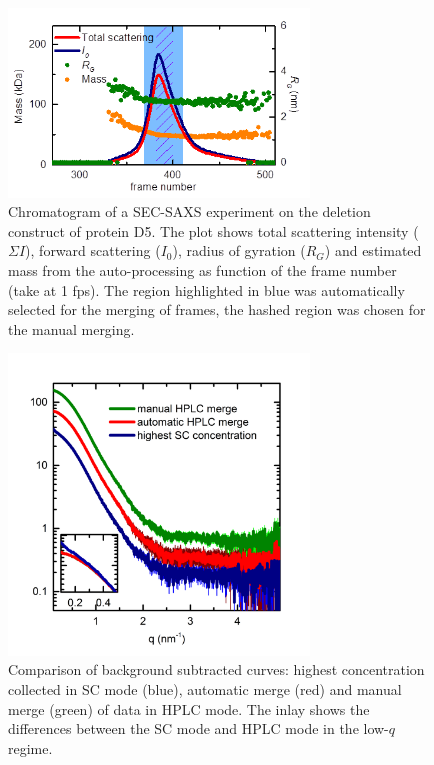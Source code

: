 \documentclass[preprint,pdf]{iucr}              %
\begin{document}
\begin{figure}
\centering
\includegraphics[width=8cm]{sec.png}
\caption{Chromatogram of a SEC-SAXS experiment on the deletion construct of
protein D5.
The plot shows total scattering intensity ($\Sigma I$), forward scattering
($I_0$), radius of gyration ($R_G$) and estimated mass from the
auto-processing as function of the frame number (take at 1 fps).
The region highlighted in blue was automatically selected for the merging of
frames, the hashed region was chosen for the manual merging.}
\label{fgr:SEC}
\end{figure}

\begin{figure}
\centering
\includegraphics[width=8cm]{curves.png}
\caption{Comparison of background subtracted curves: highest concentration
collected in SC mode (blue), automatic merge (red) and manual
merge (green) of data in HPLC mode. 
The inlay shows the differences between the SC mode and HPLC mode in the
low-$q$ regime. }
\label{fgr:curves}
\end{figure}
\end{document}
